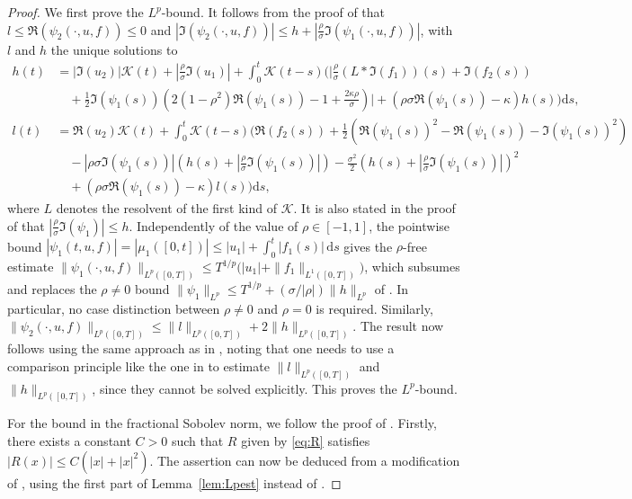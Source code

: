 \documentclass[10pt,a4paper,reqno]{amsart}
\theoremstyle{plain}
\theoremstyle{definition}
\theoremstyle{remark}
\theoremstyle{example}
\begin{document}
\begin{proof}
    We first prove the $L^p$-bound. It follows from the proof of \cite[Lem. 7.4]{abi2019affine} that $l\leq\Re(\psi_2(\cdot,u,f))\leq0$ and $|\Im(\psi_2(\cdot,u,f))|\leq h+|\frac{\rho}{\sigma}\Im(\psi_1(\cdot,u,f))|$, with $l$ and $h$ the unique solutions to 
    \begin{align*}
        h(t) &= |\Im(u_2)|\mathcal{K}(t) + |\frac{\rho}{\sigma}\Im(u_1)| + \int_0^t\mathcal{K}(t - s)\Bigg(\Bigg|\frac{\rho}{\sigma}(L \ast \Im(f_1))(s) + \Im(f_2(s)) \\
        &\quad + \frac{1}{2}\Im(\psi_1(s))\left(2(1 - \rho^2)\Re(\psi_1(s)) - 1 + \frac{2\kappa\rho}{\sigma}\right)\Bigg| + (\rho\sigma\Re(\psi_1(s)) - \kappa)h(s)\Bigg)\mathrm{d} s, \\
        l(t) &= \Re(u_2)\mathcal{K}(t) + \int_0^t\mathcal{K}(t - s)\Bigg(\Re(f_2(s)) + \frac{1}{2}\left(\Re(\psi_1(s))^2 - \Re(\psi_1(s)) - \Im(\psi_1(s))^2\right) \\
        &\quad - |\rho\sigma\Im(\psi_1(s))|\left(h(s) + |\frac{\rho}{\sigma}\Im(\psi_1(s))|\right) - \frac{\sigma^2}{2}\left(h(s) + |\frac{\rho}{\sigma}\Im(\psi_1(s))|\right)^2 \\
        &\quad + (\rho\sigma\Re(\psi_1(s)) - \kappa)l(s)\Bigg)\mathrm{d} s,
    \end{align*}
    where $L$ denotes the resolvent of the first kind of $\mathcal{K}$. It is also stated in the proof of \cite[Lem. 7.4]{abi2019affine} that $|\frac{\rho}{\sigma}\Im(\psi_1)|\leq h$. Independently of the value of $\rho\in[-1,1]$, the pointwise bound $|\psi_1(t,u,f)|=|\mu_1([0,t])|\le |u_1|+\int_0^t|f_1(s)|\,\mathrm{d}s$ gives the $\rho$-free estimate $\|\psi_1(\cdot,u,f)\|_{L^p([0,T])} \le T^{1/p}\bigl(|u_1|+\|f_1\|_{L^1([0,T])}\bigr)$, which subsumes and replaces the $\rho\ne 0$ bound $\|\psi_1\|_{L^p}\le T^{1/p}+(\sigma/|\rho|)\|h\|_{L^p}$ of \cite[Lem. 7.4]{abi2019affine}. In particular, no case distinction between $\rho\ne 0$ and $\rho=0$ is required. Similarly, $\|\psi_2(\cdot,u,f)\|_{L^p([0,T])} \leq \|l\|_{L^p([0,T])} + 2\|h\|_{L^p([0,T])}$. The result now follows using the same approach as in \cite[Lem. 3.1]{friesen2024volterra}, noting that one needs to use a comparison principle like the one in \cite[Lem. 1]{gerhold2019moment} to estimate $\|l\|_{L^p([0,T])}$ and $\|h\|_{L^p([0,T])}$, since they cannot be solved explicitly. This proves the $L^p$-bound.

    For the bound in the fractional Sobolev norm, we follow the proof of \cite[Thm. 3.7]{friesen2024volterra}. Firstly, there exists a constant $C > 0$ such that $R$ given by \eqref{eq:R} satisfies $|R(x)| \leq C(|x| + |x|^2)$. The assertion can now be deduced from a modification of \cite[Thm. 3.7]{friesen2024volterra}, using the first part of Lemma~\ref{lem:Lpest} instead of \cite[Lem. 3.1]{friesen2024volterra}.
\end{proof}
\end{document}
